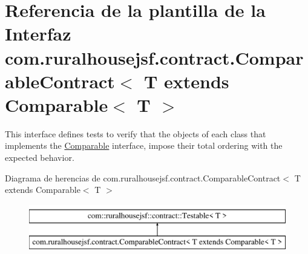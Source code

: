 \hypertarget{interfacecom_1_1ruralhousejsf_1_1contract_1_1_comparable_contract}{}\section{Referencia de la plantilla de la Interfaz com.\+ruralhousejsf.\+contract.\+Comparable\+Contract$<$ T extends Comparable$<$ T $>$}
\label{interfacecom_1_1ruralhousejsf_1_1contract_1_1_comparable_contract}


This interface defines tests to verify that the objects of each class that implements the \mbox{\hyperlink{}{Comparable}} interface, impose their total ordering with the expected behavior.  


Diagrama de herencias de com.\+ruralhousejsf.\+contract.\+Comparable\+Contract$<$ T extends Comparable$<$ T $>$\begin{figure}[H]
\begin{center}
\leavevmode
\includegraphics[height=2.000000cm]{db/d3c/interfacecom_1_1ruralhousejsf_1_1contract_1_1_comparable_contract}
\end{center}
\end{figure}

